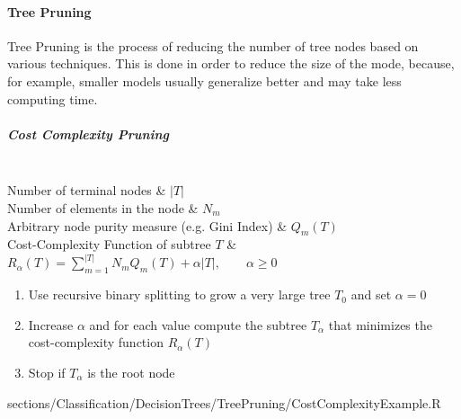		\paragraph{Tree Pruning}
		    Tree Pruning is the process of reducing the number of tree nodes based on various techniques.
			This is done in order to reduce the size of the mode, because, for example, smaller models usually generalize better and may take less computing time.
			
			\subparagraph{Cost Complexity Pruning}
				\begin{twoColTable}
					\hline
					\\
					\endhead
					\hline
					Number of terminal nodes
						& $|T|$\\
					\hline
					Number of elements in the node
						& $N_m$\\
					\hline
					Arbitrary node purity measure (e.g. Gini Index)
						& $Q_m(T)$\\
					\hline
					Cost-Complexity Function of subtree $T$
						& $R_\alpha(T) = \sum\limits_{m=1}^{|T|} N_m Q_m(T) + \alpha|T|, \qquad \alpha \geq 0$\\
					\hline
				\end{twoColTable}
				
				\RTheory
				{
					\begin{enumerate}
					    \item Use recursive binary splitting to grow a very large tree $T_0$ and set $\alpha = 0$
					    \item Increase $\alpha$ and for each value compute the subtree $T_\alpha$ that minimizes the cost-complexity function $R_\alpha(T)$
					    \item Stop if $T_\alpha$ is the root node
					\end{enumerate}
				}
				{
					sections/Classification/DecisionTrees/TreePruning/CostComplexityExample.R
				}
			
			
			
			